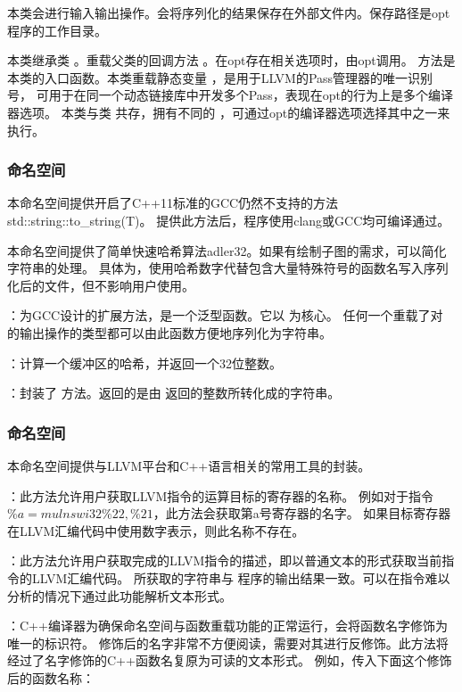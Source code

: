 本类会进行输入输出操作。会将序列化的结果保存在外部文件内。保存路径是opt程序的工作目录。

本类继承类 。重载父类的回调方法 。在opt存在相关选项时，由opt调用。
 方法是本类的入口函数。本类重载静态变量 ，是用于LLVM的Pass管理器的唯一识别号，
可用于在同一个动态链接库中开发多个Pass，表现在opt的行为上是多个编译器选项。
本类与类  共存，拥有不同的 ，可通过opt的编译器选项选择其中之一来执行。




\subsubsection{命名空间 }
本命名空间提供开启了C++11标准的GCC仍然不支持的方法std::string::to_string(T)。
提供此方法后，程序使用clang或GCC均可编译通过。

本命名空间提供了简单快速哈希算法adler32。如果有绘制子图的需求，可以简化字符串的处理。
具体为，使用哈希数字代替包含大量特殊符号的函数名写入序列化后的文件，但不影响用户使用。

：为GCC设计的扩展方法，是一个泛型函数。它以  为核心。
任何一个重载了对  的输出操作的类型都可以由此函数方便地序列化为字符串。

：计算一个缓冲区的哈希，并返回一个32位整数。

：封装了  方法。返回的是由  返回的整数所转化成的字符串。




\subsubsection{命名空间 }
本命名空间提供与LLVM平台和C++语言相关的常用工具的封装。

：此方法允许用户获取LLVM指令的运算目标的寄存器的名称。
例如对于指令 $\%a = mul nsw i32 \%22, \%21$，此方法会获取第a号寄存器的名字。
如果目标寄存器在LLVM汇编代码中使用数字表示，则此名称不存在。

：此方法允许用户获取完成的LLVM指令的描述，即以普通文本的形式获取当前指令的LLVM汇编代码。
所获取的字符串与  程序的输出结果一致。可以在指令难以分析的情况下通过此功能解析文本形式。

：C++编译器为确保命名空间与函数重载功能的正常运行，会将函数名字修饰为唯一的标识符。
修饰后的名字非常不方便阅读，需要对其进行反修饰。此方法将经过了名字修饰的C++函数名复原为可读的文本形式。
例如，传入下面这个修饰后的函数名称：

